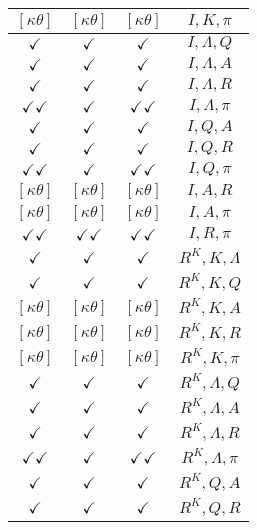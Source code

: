 \documentclass[a4paper,10pt]{article}
\begin{document}
\begin{longtable}{|c|c|c|c|}
$[\kappa \theta ]$ & $[\kappa \theta ]$ & $[\kappa \theta ]$ & ${I},{K},{\pi}$ \\
\hline
$\checkmark$ & $\checkmark$ & $\checkmark$ & ${I},{\Lambda},{Q}$ \\
\hline
$\checkmark$ & $\checkmark$ & $\checkmark$ & ${I},{\Lambda},{A}$ \\
\hline
$\checkmark$ & $\checkmark$ & $\checkmark$ & ${I},{\Lambda},{R}$ \\
\hline
$\checkmark\checkmark$ & $\checkmark$ & $\checkmark\checkmark$ & ${I},{\Lambda},{\pi}$ \\
\hline
$\checkmark$ & $\checkmark$ & $\checkmark$ & ${I},{Q},{A}$ \\
\hline
$\checkmark$ & $\checkmark$ & $\checkmark$ & ${I},{Q},{R}$ \\
\hline
$\checkmark\checkmark$ & $\checkmark$ & $\checkmark\checkmark$ & ${I},{Q},{\pi}$ \\
\hline
$[\kappa \theta ]$ & $[\kappa \theta ]$ & $[\kappa \theta ]$ & ${I},{A},{R}$ \\
\hline
$[\kappa \theta ]$ & $[\kappa \theta ]$ & $[\kappa \theta ]$ & ${I},{A},{\pi}$ \\
\hline
$\checkmark\checkmark$ & $\checkmark\checkmark$ & $\checkmark\checkmark$ & ${I},{R},{\pi}$ \\
\hline
$\checkmark$ & $\checkmark$ & $\checkmark$ & ${R^{K}},{K},{\Lambda}$ \\
\hline
$\checkmark$ & $\checkmark$ & $\checkmark$ & ${R^{K}},{K},{Q}$ \\
\hline
$[\kappa \theta ]$ & $[\kappa \theta ]$ & $[\kappa \theta ]$ & ${R^{K}},{K},{A}$ \\
\hline
$[\kappa \theta ]$ & $[\kappa \theta ]$ & $[\kappa \theta ]$ & ${R^{K}},{K},{R}$ \\
\hline
$[\kappa \theta ]$ & $[\kappa \theta ]$ & $[\kappa \theta ]$ & ${R^{K}},{K},{\pi}$ \\
\hline
$\checkmark$ & $\checkmark$ & $\checkmark$ & ${R^{K}},{\Lambda},{Q}$ \\
\hline
$\checkmark$ & $\checkmark$ & $\checkmark$ & ${R^{K}},{\Lambda},{A}$ \\
\hline
$\checkmark$ & $\checkmark$ & $\checkmark$ & ${R^{K}},{\Lambda},{R}$ \\
\hline
$\checkmark\checkmark$ & $\checkmark$ & $\checkmark\checkmark$ & ${R^{K}},{\Lambda},{\pi}$ \\
\hline
$\checkmark$ & $\checkmark$ & $\checkmark$ & ${R^{K}},{Q},{A}$ \\
\hline
$\checkmark$ & $\checkmark$ & $\checkmark$ & ${R^{K}},{Q},{R}$ \\

\end{longtable}
\end{document}

